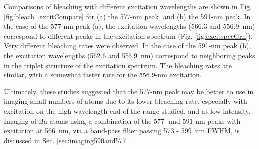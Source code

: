 Comparisons of bleaching with different excitation wavelengths are shown in Fig. \ref{fig:bleach_excitCompare} for (a) the 577-nm peak, and (b) the 591-nm peak.  In the case of the 577-nm peak (a), the excitation wavelengths (566.3 and 556.9~nm) correspond to different peaks in the excitation spectrum (Fig. \ref{fig:excitspecGrn}).  Very different bleaching rates were observed.  In the case of the 591-nm peak (b), the excitation wavelengths (562.6 and 556.9~nm) correspond to neighboring peaks in the triplet structure of the excitation spectrum.  The bleaching rates are similar, with a somewhat faster rate for the 556.9-nm excitation.


Ultimately, these studies suggested that the 577-nm peak may be better to use in imaging small numbers of atoms due to its lower bleaching rate, especially with excitation on the high-wavelength end of the range studied, and at low intensity.  Imaging of Ba atoms using a combination of the 577- and 591-nm peaks with excitation at 566~nm, via a band-pass filter passing 573 - 599~nm FWHM, is discussed in Sec. \ref{sec:imaging590and577}.

